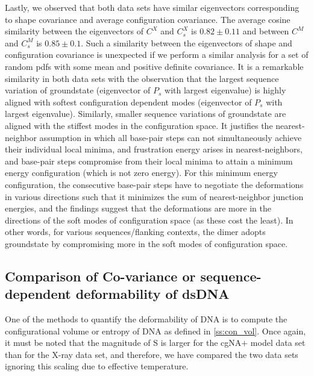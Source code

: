 Lastly, we observed that both data sets have similar eigenvectors corresponding to shape covariance and average configuration covariance. 
The average cosine similarity between the eigenvectors of $C^X$ and $C_s^X$ is $0.82 \pm 0.11$ and between $C^M$ and $C_s^M$ is $0.85 \pm 0.1$. 
Such a similarity between the eigenvectors of shape and configuration covariance is unexpected if we perform a similar analysis for a set of random pdfs with some mean and positive definite covariance. 
It is a remarkable similarity in both data sets with the observation that the 
largest sequence variation of groundstate (eigenvector of $P_s$ with largest eigenvalue) is highly aligned with softest configuration dependent modes (eigenvector of $P_s$ with largest eigenvalue). 
Similarly, smaller sequence variations of groundstate are aligned with the stiffest modes in the configuration space.
It justifies the nearest-neighbor assumption in which all base-pair steps can not simultaneously achieve their individual local minima, and frustration energy arises in nearest-neighbors, and base-pair steps compromise from their local minima to attain a minimum energy configuration (which is not zero energy).
For this minimum energy configuration, the consecutive base-pair steps have to negotiate the deformations in various directions such that it minimizes the sum of nearest-neighbor junction energies, and the findings suggest that the deformations are more in the directions of the soft modes of configuration space (as these cost the least).
In other words, for various sequences/flanking contexts, the dimer adopts groundstate by compromising more in the soft modes of configuration space.


\subsection{Comparison of Co-variance or sequence-dependent deformability of dsDNA}
One of the methods to quantify the deformability of DNA is to compute the configurational volume or entropy of DNA as defined in \cref{ss:con_vol}. 
Once again, it must be noted that the magnitude of S is larger for the cgNA$+$ model data set than for the X-ray data set, and therefore, we have compared the two data sets ignoring this scaling due to effective temperature.

